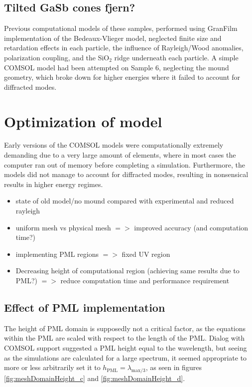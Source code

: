 \subsection{Tilted GaSb cones \color{red}fjern?}
\label{sec:implementation_gasb_cones}


Previous computational models of these samples, performed using GranFilm implementation of the Bedeaux-Vlieger model, neglected finite size and retardation effects in each particle, the influence of Rayleigh/Wood anomalies, polarization coupling, and the SiO$_2$ ridge underneath each particle. A simple COMSOL model had been attempted on Sample 6, neglecting the mound geometry, which broke down for higher energies where it failed to account for diffracted modes.

\section{Optimization of model}
Early versions of the COMSOL models were computationally extremely demanding due to a very large amount of elements, where in most cases the computer ran out of memory before completing a simulation. Furthermore, the models did not manage to account for diffracted modes, resulting in nonsensical results in higher energy regimes. 

\label{sec:Optimization_of_model}
\begin{itemize}
    \item state of old model/no mound compared with experimental and reduced rayleigh
    \item uniform mesh vs physical mesh $=>$ improved accuracy (and computation time?)
    \item implementing PML regions $=>$ fixed UV region
    \item Decreasing height of computational region (achieving same results due to PML?) $=>$ reduce computation time and performance requirement
\end{itemize}

\subsection{Effect of PML implementation}
The height of PML domain is supposedly not a critical factor, as the equations within the PML are scaled with respect to the length of the PML. Dialog with COMSOL support suggested a PML height equal to the wavelength, but seeing as the simulations are calculated for a large spectrum, it seemed appropriate to more or less arbitrarily set it to $h_{\text{PML}}=\lambda_{\text{max}/3}$, as seen in figures \ref{fig:meshDomainHeight_c} and \ref{fig:meshDomainHeight_d}. 


